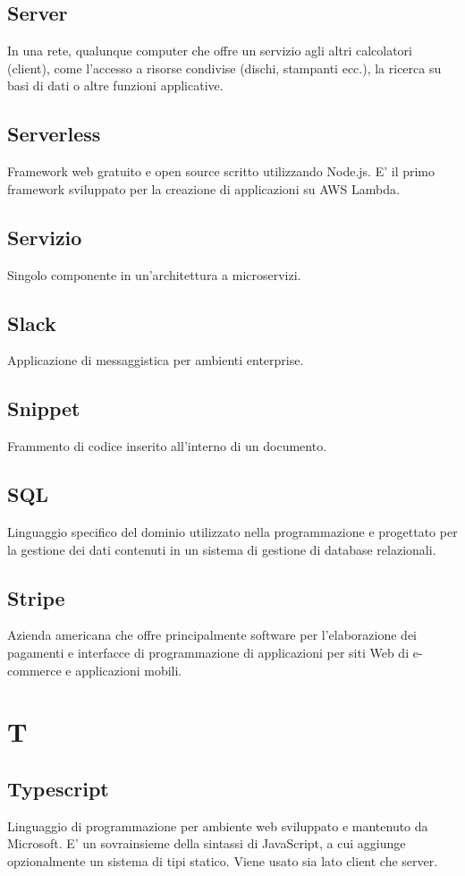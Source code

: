 \subsection*{Server}
In una rete, qualunque computer che offre un servizio agli altri calcolatori (client), come l'accesso a risorse condivise (dischi, stampanti ecc.), la ricerca su basi di dati o altre funzioni applicative.

\subsection*{Serverless}
Framework web gratuito e open source scritto utilizzando Node.js. E' il primo framework sviluppato per la creazione di applicazioni su AWS Lambda.

\subsection*{Servizio}
Singolo componente in un'architettura a microservizi.

\subsection*{Slack}
Applicazione di messaggistica per ambienti enterprise.

\subsection*{Snippet}
Frammento di codice inserito all'interno di un documento.

\subsection*{SQL}
Linguaggio specifico del dominio utilizzato nella programmazione e progettato per la gestione dei dati contenuti in un sistema di gestione di database relazionali.

\subsection*{Stripe}
Azienda americana che offre principalmente software per l'elaborazione dei pagamenti e interfacce di programmazione di applicazioni per siti Web di e-commerce e applicazioni mobili.

\section*{T}
\subsection*{Typescript}
Linguaggio di programmazione per ambiente web sviluppato e mantenuto da Microsoft. E' un sovrainsieme della sintassi di JavaScript, a cui aggiunge opzionalmente un sistema di tipi statico. Viene usato sia lato client che server.


